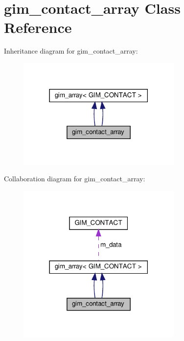\hypertarget{classgim__contact__array}{}\section{gim\+\_\+contact\+\_\+array Class Reference}
\label{classgim__contact__array}


Inheritance diagram for gim\+\_\+contact\+\_\+array\+:
\nopagebreak
\begin{figure}[H]
\begin{center}
\leavevmode
\includegraphics[width=230pt]{classgim__contact__array__inherit__graph}
\end{center}
\end{figure}


Collaboration diagram for gim\+\_\+contact\+\_\+array\+:
\nopagebreak
\begin{figure}[H]
\begin{center}
\leavevmode
\includegraphics[width=230pt]{classgim__contact__array__coll__graph}
\end{center}
\end{figure}

